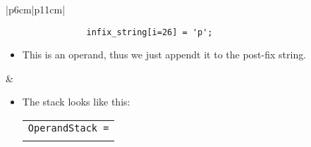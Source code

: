 \begin{center}
\begin{longtable}{ |p{6cm}|p{11cm}| }
         \\
        \hline 
        \hline

        {
            \begin{verbatim}
                infix_string[i=26] = 'p';
            \end{verbatim}
        }
        \begin{itemize}
            \item This is an operand, thus we just appendt it to the post-fix string. 
        \end{itemize}
        & 
        \begin{itemize}
            \item The stack looks like this: 
                {
                    \begin{center}
                        \begin{tabular}{ c }
                            \texttt{OperandStack =} \\ \\
                        \end{tabular}
                        \begin{bytefield}{10}
                             \\
                        \end{bytefield}
                    \end{center}
                }
            

\end{itemize}
\end{longtable}
\end{center}
